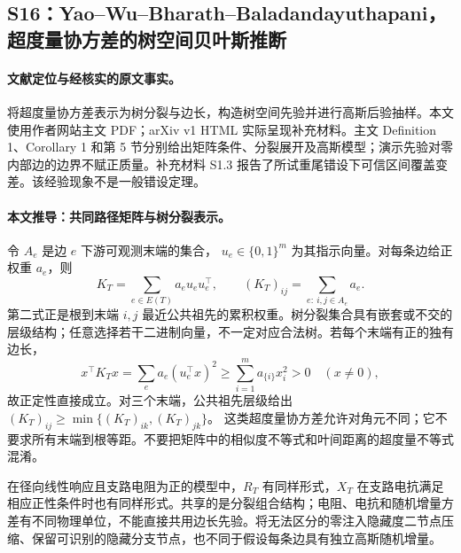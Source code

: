 \documentclass[UTF8,11pt,fontset=fandol]{ctexart}
\theoremstyle{remark}
\numberwithin{equation}{section}
\begin{document}
\subsection{S16：Yao--Wu--Bharath--Baladandayuthapani，超度量协方差的树空间贝叶斯推断}
\label{subsec:S16}

\paragraph{文献定位与经核实的原文事实。}
\citet{S16} 将超度量协方差表示为树分裂与边长，构造树空间先验并进行高斯后验抽样。本文使用作者网站主文 PDF；arXiv v1 HTML 实际呈现补充材料。主文 Definition 1、Corollary 1 和第 5 节分别给出矩阵条件、分裂展开及高斯模型；演示先验对零内部边的边界不赋正质量。补充材料 S1.3 报告了所试重尾错设下可信区间覆盖变差。该经验现象不是一般错设定理。

\paragraph{本文推导：共同路径矩阵与树分裂表示。}
令 $A_e$ 是边 $e$ 下游可观测末端的集合，
$u_e\in\{0,1\}^m$ 为其指示向量。对每条边给正权重 $a_e$，则
\[
 K_T=\sum_{e\in E(T)}a_eu_eu_e^\top,\qquad
 (K_T)_{ij}=\sum_{e:\ i,j\in A_e}a_e.
\]
第二式正是根到末端 $i,j$ 最近公共祖先的累积权重。树分裂集合具有嵌套或不交的层级结构；任意选择若干二进制向量，不一定对应合法树。若每个末端有正的独有边长，
\[
 x^\top K_Tx=\sum_e a_e(u_e^\top x)^2
 \ge\sum_{i=1}^m a_{\{i\}}x_i^2>0
 \quad(x\ne0),
\]
故正定性直接成立。对三个末端，公共祖先层级给出
$(K_T)_{ij}\ge\min\{(K_T)_{ik},(K_T)_{jk}\}$。
这类超度量协方差允许对角元不同；它不要求所有末端到根等距。不要把矩阵中的相似度不等式和叶间距离的超度量不等式混淆。

在径向线性响应且支路电阻为正的模型中，$R_T$ 有同样形式，$X_T$ 在支路电抗满足相应正性条件时也有同样形式。共享的是分裂组合结构；电阻、电抗和随机增量方差有不同物理单位，不能直接共用边长先验。将无法区分的零注入隐藏度二节点压缩、保留可识别的隐藏分支节点，也不同于假设每条边具有独立高斯随机增量。
\end{document}
